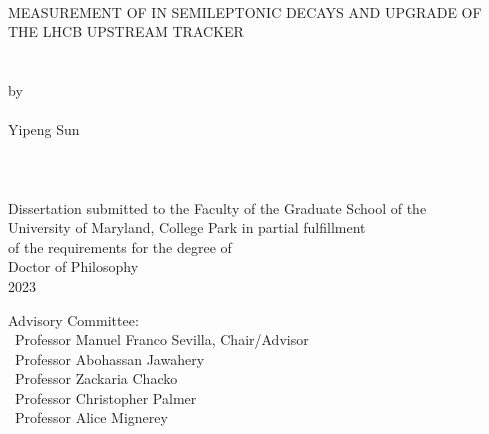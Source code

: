 
\thispagestyle{empty} \hbox{\ } \vspace{1.5in}
\renewcommand{\baselinestretch}{1}
\small\normalsize
\begin{center}

{\large MEASUREMENT OF \RDX IN SEMILEPTONIC \B DECAYS AND
UPGRADE OF THE LHCB UPSTREAM TRACKER}  \\
\ \\
\ \\
\large{by} \\
\ \\
\large{Yipeng Sun}
\ \\
\ \\
\ \\
\ \\
\normalsize
Dissertation submitted to the Faculty of the Graduate School of the \\
University of Maryland, College Park in partial fulfillment \\
of the requirements for the degree of \\
Doctor of Philosophy \\
2023
\end{center}

\vspace{7.5em}

\noindent Advisory Committee: \\
\hbox{\ }\hspace{.5in}Professor Manuel Franco Sevilla, Chair/Advisor \\
\hbox{\ }\hspace{.5in}Professor Abohassan Jawahery \\
\hbox{\ }\hspace{.5in}Professor Zackaria Chacko \\
\hbox{\ }\hspace{.5in}Professor Christopher Palmer \\
\hbox{\ }\hspace{.5in}Professor Alice Mignerey
